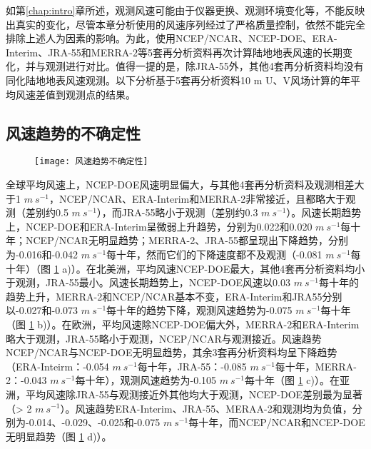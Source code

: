 如第\ref{chap:intro}章所述，观测风速可能由于仪器更换、观测环境变化等，不能反映出真实的变化，尽管本章分析使用的风速序列经过了严格质量控制，依然不能完全排除上述人为因素的影响。为此，使用NCEP/NCAR、NCEP-DOE、ERA-Interim、JRA-55和MERRA-2等5套再分析资料再次计算陆地地表风速的长期变化，并与观测进行对比。值得一提的是，除JRA-55外，其他4套再分析资料均没有同化陆地地表风速观测。以下分析基于5套再分析资料10 m U、V风场计算的年平均风速差值到观测点的结果。

\subsection{风速趋势的不确定性}

\begin{figure}[!t]
    \centering
    \texttt{[image: 风速趋势不确定性]}
    \label{fig:uncertaintywindtrend}
\end{figure}

全球平均风速上，NCEP-DOE风速明显偏大，与其他4套再分析资料及观测相差大于1 $m ~ s^{-1}$，NCEP/NCAR、ERA-Interim和MERRA-2非常接近，且都略大于观测（差别约0.5 $m ~ s^{-1}$），而JRA-55略小于观测（差别约0.3 $m ~ s^{-1}$）。风速长期趋势上，NCEP-DOE和ERA-Interim呈微弱上升趋势，分别为0.022和0.020 $m ~ s^{-1}$每十年；NCEP/NCAR无明显趋势；MERRA-2、JRA-55都呈现出下降趋势，分别为-0.016和-0.042 $m ~ s^{-1}$每十年，然而它们的下降速度都不及观测（-0.081 $m ~ s^{-1}$每十年）（图 \ref{fig:uncertaintywindtrend} a)）。在北美洲，平均风速NCEP-DOE最大，其他4套再分析资料均小于观测，JRA-55最小。风速长期趋势上，NCEP-DOE风速以0.03 $m ~ s^{-1}$每十年的趋势上升，MERRA-2和NCEP/NCAR基本不变，ERA-Interim和JRA55分别以-0.027和-0.073 $m ~ s^{-1}$每十年的趋势下降，观测风速趋势为-0.075 $m ~ s^{-1}$每十年（图 \ref{fig:uncertaintywindtrend} b)）。在欧洲，平均风速除NCEP-DOE偏大外，MERRA-2和ERA-Interim略大于观测，JRA-55略小于观测，NCEP/NCAR与观测接近。风速趋势NCEP/NCAR与NCEP-DOE无明显趋势，其余3套再分析资料均呈下降趋势（ERA-Inteirm：-0.054 $m ~ s^{-1}$每十年，JRA-55：-0.085 $m ~ s^{-1}$每十年，MERRA-2：-0.043 $m ~ s^{-1}$每十年），观测风速趋势为-0.105 $m ~ s^{-1}$每十年（图 \ref{fig:uncertaintywindtrend} c)）。在亚洲，平均风速除JRA-55与观测接近外其他均大于观测，NCEP-DOE差别最为显著（> 2 $m ~ s^{-1}$）。风速趋势ERA-Interim、JRA-55、MERAA-2和观测均为负值，分别为-0.014、-0.029、-0.025和-0.075 $m ~ s^{-1}$每十年，而NCEP/NCAR和NCEP-DOE无明显趋势（图 \ref{fig:uncertaintywindtrend} d)）。


